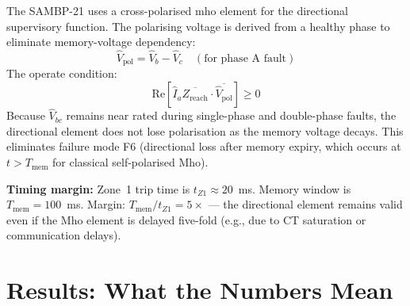 \documentclass[12pt,a4paper]{article}
\begin{document}
The SAMBP-21 uses a cross-polarised mho element for the directional supervisory function. The polarising voltage is derived from a healthy phase to eliminate memory-voltage dependency:
\begin{equation}
  \hat{V}_\mathrm{pol} = \hat{V}_b - \hat{V}_c \quad (\text{for phase~A fault})
  \label{eq:crosspol}
\end{equation}
The operate condition:
\begin{equation}
  \mathrm{Re}\!\left[\hat{I}_a \overline{Z_\mathrm{reach}} \cdot \overline{\hat{V}_\mathrm{pol}}\right] \geq 0
  \label{eq:crosspol_operate}
\end{equation}
Because $\hat{V}_{bc}$ remains near rated during single-phase and double-phase faults, the directional element does not lose polarisation as the memory voltage decays. This eliminates failure mode F6 (directional loss after memory expiry, which occurs at $t > T_\mathrm{mem}$ for classical self-polarised Mho).

\textbf{Timing margin:} Zone~1 trip time is $t_{Z1} \approx 20$~ms. Memory window is $T_\mathrm{mem} = 100$~ms. Margin: $T_\mathrm{mem}/t_{Z1} = 5\times$ --- the directional element remains valid even if the Mho element is delayed five-fold (e.g., due to CT saturation or communication delays).

\section{Results: What the Numbers Mean}
\end{document}
